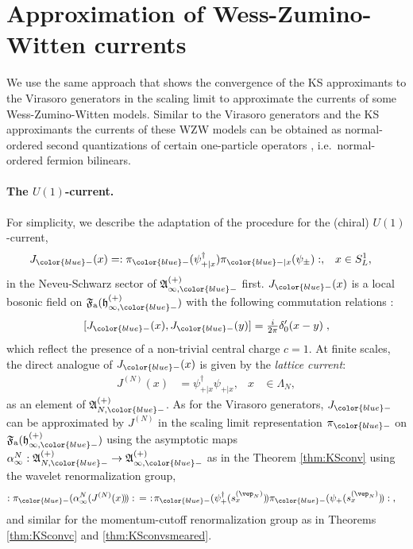 \documentclass[a4paper, 11pt]{article}
\newcommand{\fA}{\mathfrak{A}}\newcommand{\cA}{\mathcal{A}}\newcommand{\dA}{\mathds{A}}\newcommand{\sA}{\mathscr{A}}
\newcommand{\ua}{\textup a}
\newcommand{\fF}{\mathfrak{F}}\newcommand{\cF}{\mathcal{F}}\newcommand{\dF}{\mathds{F}}\newcommand{\sF}{\mathscr{F}}
\newcommand{\fh}{\mathfrak{h}}
\DeclareMathOperator{\1}{\mathds{1}}
\begin{document}
\section{Approximation of Wess-Zumino-Witten currents}
\label{sec:WZWcur}
We use the same approach that shows the convergence of the KS approximants to the Virasoro generators in the scaling limit to approximate the currents of some Wess-Zumino-Witten models. Similar to the Virasoro generators and the KS approximants the currents of these WZW models can be obtained as normal-ordered second quantizations of certain one-particle operators \cite{DiFrancescoCFTBook, EvansQuantumSymmetriesOn, WassermannOperatorAlgebrasAnd}, i.e.~normal-ordered fermion bilinears.

\bigskip

\paragraph{The $U(1)$-current.}
For simplicity, we describe the adaptation of the procedure for the (chiral) $U(1)$-current,
\begin{align}
\label{eq:U1cur}
J_{{\color{blue}-}}(x) & = :\pi_{{\color{blue}-}}(\psi_{+|x}^{\dag})\pi_{{\color{blue}-}|x}(\psi_{\pm}):, & x & \in S^{1}_{L},
\end{align}
in the Neveu-Schwarz sector of $\fA^{(+)}_{\infty,{\color{blue}-}}$ first. $J_{{\color{blue}-}}(x)$ is a local bosonic field on $\fF_{\ua}(\fh^{(+)}_{\infty,{\color{blue}-}})$ with the following commutation relations \cite{RehrenCFTLectures}:
\begin{align}
\label{eq:U1curcom}
[J_{{\color{blue}-}}(x),J_{{\color{blue}-}}(y)] = \tfrac{i}{2\pi}\delta'_{0}(x-y)\;,
\end{align}
which reflect the presence of a non-trivial central charge $c=1$. At finite scales, the direct analogue of $J_{{\color{blue}-}}(x)$ is given by the \emph{lattice current}:
\begin{align}
\label{eq:U1curfinite}
J^{(N)}(x) & = \psi_{+|x}^{\dag}\psi_{+|x}, & x & \in\Lambda_{N}, 
\end{align}
as an element of $\fA^{(+)}_{N,{\color{blue}-}}$. As for the Virasoro generators, $J_{{\color{blue}-}}$ can be approximated by $J^{(N)}$ in the scaling limit representation $\pi_{{\color{blue}-}}$ on $\fF_{\ua}(\fh^{(+)}_{\infty,{\color{blue}-}})$ using the asymptotic maps $\alpha^{N}_{\infty}:\fA^{(+)}_{N,{\color{blue}-}}\rightarrow\fA^{(+)}_{\infty,{\color{blue}-}}$ as in the Theorem \ref{thm:KSconv} using the wavelet renormalization group, 
\begin{align}
\label{eq:U1curapprox}
:\pi_{{\color{blue}-}}(\alpha^{N}_{\infty}(J^{(N)}(x)\!)\!):\!\ & =\ :\!\pi_{{\color{blue}-}}(\psi_{+}^{\dag}(s^{(\vep_{N})}_{x})\!)\pi_{{\color{blue}-}}(\psi_{+}(s^{(\vep_{N})}_{x})\!):\;,
\end{align}
and similar for the momentum-cutoff renormalization group as in Theorems \ref{thm:KSconvc} and \ref{thm:KSconvsmeared}.
\end{document}
